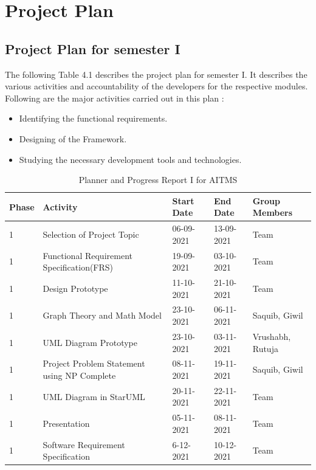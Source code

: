 \documentclass[openany,12pt]{report}
\begin{document}
	
	\section{Project Plan}
	
	\subsection{Project Plan for semester I}
	
	\hspace*{0.5 in}The following Table 4.1 describes the project plan for semester I. It describes the various activities and accountability of the developers for the respective modules. Following are the major activities carried out in this plan :
	\begin{itemize}
		\item{Identifying the functional requirements.}
		\item{Designing of the Framework.}
		\item{Studying the necessary development tools and technologies.}
	\end{itemize}
	
	\newpage
	\begin{table} [htb]
		\centering
		\begin{tabular}{| p{1.2 cm}| p{5 cm}| p{2.5 cm}| p{2.5 cm}| p{3 cm}| }\hline
			\textbf{Phase}	&\textbf{Activity}	&\textbf{Start Date}	&\textbf{End Date} &\textbf{Group Members}\\\hline\hline
			1 &Selection of Project Topic	&06-09-2021 	&13-09-2021 &Team \\\hline
			1 &Functional Requirement Specification(FRS) &19-09-2021 &03-10-2021 &Team\\\hline
			1 &Design Prototype &11-10-2021 &21-10-2021 &Team\\\hline
			1 &Graph Theory and Math Model &23-10-2021 &06-11-2021 & Saquib, Giwil\\\hline
			1 &UML Diagram Prototype &23-10-2021 &03-11-2021 &Vrushabh, \newline Rutuja \\\hline
			1 &Project Problem Statement using NP Complete &08-11-2021 &19-11-2021 &Saquib, Giwil\\\hline
			1 &UML Diagram in StarUML &20-11-2021 &22-11-2021 &Team \\\hline
			1 &Presentation &05-11-2021 &08-11-2021 &Team \\\hline
			1 &Software Requirement Specification &6-12-2021 &10-12-2021 &Team \\\hline
		\end{tabular}
		\caption{Planner and Progress Report I for AITMS}
		\label{tab:nnwork}
	\end{table}
\end{document}
